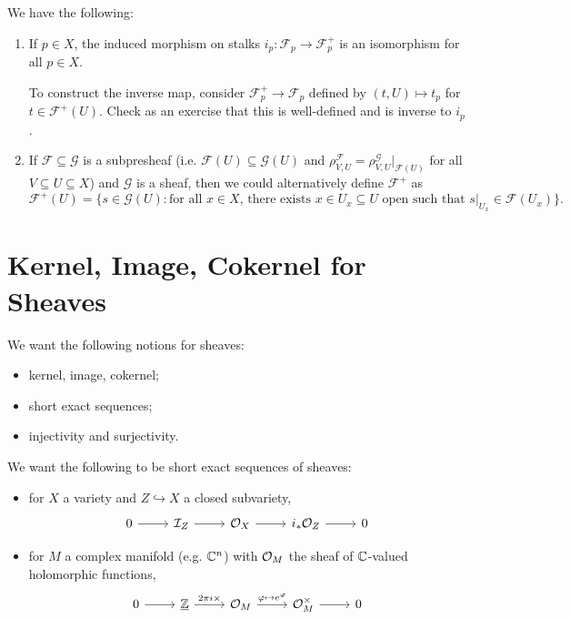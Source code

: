 \begin{remark}\label{rem:properties-of-sheafification}
  We have the following:
  \begin{enumerate}
    \item If $p \in X$, the induced
      morphism on stalks
      $i_p : \mathcal{F}_p \to \mathcal{F}_p^+$ is
      an isomorphism for all
      $p \in X$.

      To construct the inverse map,
      consider $\mathcal{F}^+_p \to \mathcal{F}_p$
      defined by $(t, U) \mapsto t_p$
      for $t \in \mathcal{F}^+(U)$.
      Check as an exercise that this
      is well-defined and is inverse
      to $i_p$.
    \item If $\mathcal{F} \subseteq \mathcal{G}$
      is a subpresheaf (i.e.
      $\mathcal{F}(U) \subseteq \mathcal{G}(U)$
      and $\rho_{V, U}^{\mathcal{F}} = \rho_{V, U}^{\mathcal{G}}|_{\mathcal{F}(U)}$
      for all $V \subseteq U \subseteq X$)
      and $\mathcal{G}$ is a sheaf,
      then we could alternatively
      define $\mathcal{F}^+$ as
      \[
        \mathcal{F}^+(U)
        = \{
          s \in \mathcal{G}(U)
          : \text{for all } x \in X,\,
          \text{there exists }
          x \in U_x \subseteq U
          \text{ open such that }
          s|_{U_x} \in \mathcal{F}(U_x)
        \}.
      \]
  \end{enumerate}
\end{remark}

\section{Kernel, Image, Cokernel for Sheaves}

\begin{remark}
  We want the following notions for
  sheaves:
  \begin{itemize}
    \item kernel, image, cokernel;
    \item short exact sequences;
    \item injectivity and surjectivity.
  \end{itemize}
\end{remark}

\begin{example}
  We want the following to be
  short exact sequences of sheaves:
  \begin{itemize}
    \item for $X$ a variety and
      $Z \hookrightarrow X$ a
      closed subvariety,
      \[
      \begin{tikzcd}
        0 \ar[r] & \mathcal{I}_Z \ar[r] & \OO_X \ar[r] & i_* \OO_Z \ar[r] & 0
      \end{tikzcd}
      \]
    \item for $M$ a complex manifold
      (e.g. $\mathbb{C}^n$) with
      $\mathcal{O}_M$ the sheaf of
      $\mathbb{C}$-valued holomorphic functions,
      \[
        \begin{tikzcd}
          0 \ar[r] & \underline{\Z} \ar[r, "2\pi i \times"] & \OO_M \ar[r, "\varphi \mapsto e^\varphi"] & \OO_M^\times \ar[r] & 0
        \end{tikzcd}
      \]
  \end{itemize}
\end{example}

